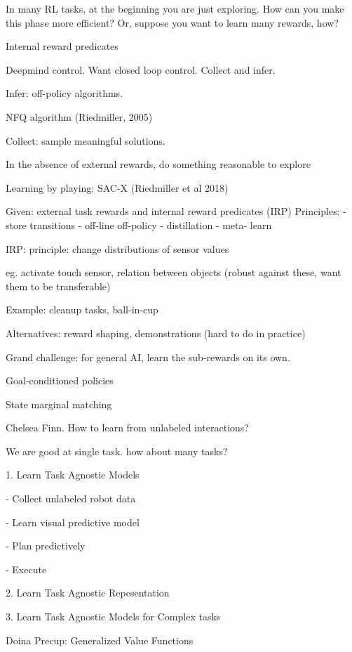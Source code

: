 \documentclass[english]{article}
\begin{document}
In many RL tasks, at the beginning you are just exploring. How can you make this phase more efficient? Or, suppose you want to learn many rewards, how?


\item Internal reward predicates

Deepmind control. Want closed loop control. Collect and infer. 

Infer: off-policy algorithms. 

NFQ algorithm (Riedmiller, 2005)

Collect: sample meaningful solutions. 

In the absence of external rewards, do something reasonable to explore

Learning by playing: SAC-X (Riedmiller et al 2018)

Given: external task rewards and internal reward predicates (IRP)
Principles:
- store transitions
- off-line off-policy 
- distillation
- meta- learn

IRP: principle: change distributions of sensor values

eg. activate touch sensor, relation between objects (robust against these, want them to be transferable)

Example: cleanup tasks, ball-in-cup

Alternatives: reward shaping, demonstrations (hard to do in practice)

Grand challenge: for general AI, learn the sub-rewards on its own. 

\item Goal-conditioned policies

\item State marginal matching

\item Chelsea Finn. How to learn from unlabeled interactions?

We are good at single task. how about many tasks?

1. Learn Task Agnostic Models

- Collect unlabeled robot data

- Learn visual predictive model

- Plan predictively

- Execute

2. Learn Task Agnostic Repesentation

3. Learn Task Agnostic Models for Complex tasks

\item Doina Precup: Generalized Value Functions
\end{document}
